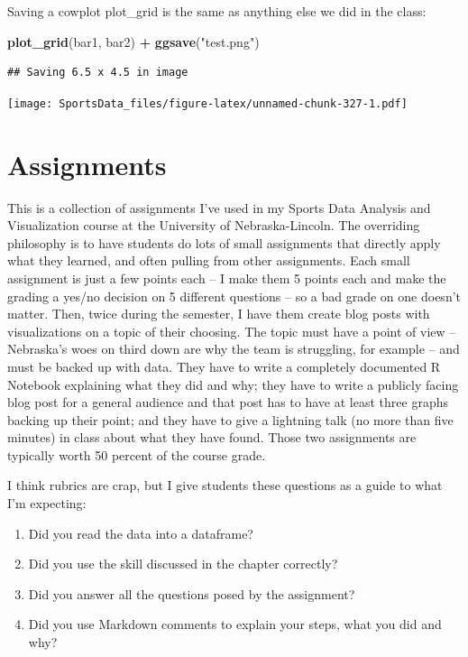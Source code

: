 \documentclass[]{book}
\newenvironment{Shaded}{\begin{snugshade}}{\end{snugshade}}
\newcommand{\KeywordTok}[1]{\textcolor[rgb]{0.13,0.29,0.53}{\textbf{#1}}}
\newcommand{\NormalTok}[1]{#1}
\newcommand{\OperatorTok}[1]{\textcolor[rgb]{0.81,0.36,0.00}{\textbf{#1}}}
\newcommand{\StringTok}[1]{\textcolor[rgb]{0.31,0.60,0.02}{#1}}
\providecommand{\tightlist}{%
  \setlength{\itemsep}{0pt}\setlength{\parskip}{0pt}}
\begin{document}
Saving a cowplot plot\_grid is the same as anything else we did in the class:

\begin{Shaded}
\begin{Highlighting}[]
\KeywordTok{plot_grid}\NormalTok{(bar1, bar2) }\OperatorTok{+}\StringTok{ }\KeywordTok{ggsave}\NormalTok{(}\StringTok{"test.png"}\NormalTok{)}
\end{Highlighting}
\end{Shaded}

\begin{verbatim}
## Saving 6.5 x 4.5 in image
\end{verbatim}

\texttt{[image: SportsData\_files/figure-latex/unnamed-chunk-327-1.pdf]}

\hypertarget{assignments}{%
\chapter{Assignments}\label{assignments}}

This is a collection of assignments I've used in my Sports Data Analysis and Visualization course at the University of Nebraska-Lincoln. The overriding philosophy is to have students do lots of small assignments that directly apply what they learned, and often pulling from other assignments. Each small assignment is just a few points each -- I make them 5 points each and make the grading a yes/no decision on 5 different questions -- so a bad grade on one doesn't matter. Then, twice during the semester, I have them create blog posts with visualizations on a topic of their choosing. The topic must have a point of view -- Nebraska's woes on third down are why the team is struggling, for example -- and must be backed up with data. They have to write a completely documented R Notebook explaining what they did and why; they have to write a publicly facing blog post for a general audience and that post has to have at least three graphs backing up their point; and they have to give a lightning talk (no more than five minutes) in class about what they have found. Those two assignments are typically worth 50 percent of the course grade.

I think rubrics are crap, but I give students these questions as a guide to what I'm expecting:

\begin{enumerate}
\def\labelenumi{\arabic{enumi}.}
\tightlist
\item
  Did you read the data into a dataframe?
\item
  Did you use the skill discussed in the chapter correctly?
\item
  Did you answer all the questions posed by the assignment?
\item
  Did you use Markdown comments to explain your steps, what you did and why?
\end{enumerate}
\end{document}
